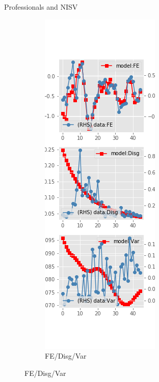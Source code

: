 \documentclass{beamer}
\begin{document}
\begin{frame}{Professionals and NISV}
\begin{figure}[ht]
\begin{subfigure}[b]{0.2\textwidth}
		\end{subfigure}
		\hfill
		\begin{subfigure}[b]{0.2\textwidth}
			\caption{FE/Disg/Var}
			\includegraphics[width=\textwidth, height = 0.8\textheight]{figuresDraft/spf_ni_est_sv_diag3.png}
		\end{subfigure}
	\end{figure}
\end{frame}
\end{document}
